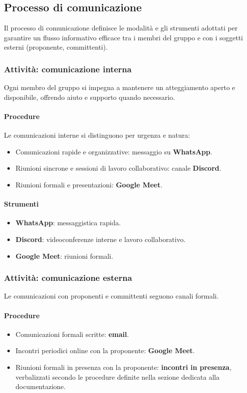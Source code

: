 \documentclass[11pt,a4paper]{article}
\begin{document}
\subsection{Processo di comunicazione}
Il processo di comunicazione definisce le modalità e gli strumenti adottati
per garantire un flusso informativo efficace tra i membri del gruppo e con
i soggetti esterni (proponente, committenti).

\subsubsection{Attività: comunicazione interna}
Ogni membro del gruppo si impegna a mantenere un atteggiamento aperto e
disponibile, offrendo aiuto e supporto quando necessario.

\paragraph{Procedure}
Le comunicazioni interne si distinguono per urgenza e natura:
\begin{itemize}
    \item Comunicazioni rapide e organizzative: messaggio su \textbf{WhatsApp}.
    \item Riunioni sincrone e sessioni di lavoro collaborativo: canale
    \textbf{Discord}.
    \item Riunioni formali e presentazioni: \textbf{Google Meet}.
\end{itemize}

\paragraph{Strumenti}
\begin{itemize}
    \item \textbf{WhatsApp}: messaggistica rapida.
    \item \textbf{Discord}: videoconferenze interne e lavoro collaborativo.
    \item \textbf{Google Meet}: riunioni formali.
\end{itemize}

\subsubsection{Attività: comunicazione esterna}
Le comunicazioni con proponenti e committenti seguono canali formali.

\paragraph{Procedure}
\begin{itemize}
    \item Comunicazioni formali scritte: \textbf{email}.
    \item Incontri periodici online con la proponente: \textbf{Google Meet}.
    \item Riunioni formali in presenza con la proponente: \textbf{incontri
    in presenza}, verbalizzati secondo le procedure definite nella sezione
    dedicata alla documentazione.
\end{itemize}
\end{document}
